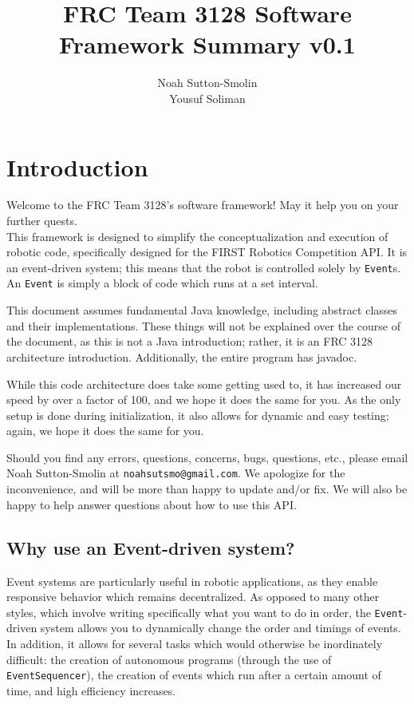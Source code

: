 \documentclass[a4paper]{article}
\title{FRC Team 3128 Software Framework Summary v0.1}
\author{Noah Sutton-Smolin\\Yousuf Soliman}
\begin{document}
\maketitle\tableofcontents\pagebreak

\section{Introduction} Welcome to the FRC Team 3128's software framework! May it help you on your further quests.\\ This framework is designed to simplify the conceptualization and execution of robotic code, specifically designed for the FIRST Robotics Competition API. It is an event-driven system; this means that the robot is controlled solely by \lstinline{Event}s. An \lstinline{Event} is simply a block of code which runs at a set interval. 

This document assumes fundamental Java knowledge, including abstract classes and their implementations. These things will not be explained over the course of the document, as this is not a Java introduction; rather, it is an FRC 3128 architecture introduction. Additionally, the entire program has javadoc.

While this code architecture does take some getting used to, it has increased our speed by over a factor of 100, and we hope it does the same for you. As the only setup is done during initialization, it also allows for dynamic and easy testing; again, we hope it does the same for you.\newline

Should you find any errors, questions, concerns, bugs, questions, etc., please email Noah Sutton-Smolin at \lstinline{noahsutsmo@gmail.com}. We apologize for the inconvenience, and will be more than happy to update and/or fix. We will also be happy to help answer questions about how to use this API.

\subsection{Why use an Event-driven system?}

Event systems are particularly useful in robotic applications, as they enable responsive behavior which remains decentralized. As opposed to many other styles, which involve writing specifically what you want to do in order, the \lstinline{Event}-driven system allows you to dynamically change the order and timings of events. In addition, it allows for several tasks which would otherwise be inordinately difficult: the creation of autonomous programs (through the use of \lstinline{EventSequencer}), the creation of events which run after a certain amount of time, and high efficiency increases.
\end{document}
